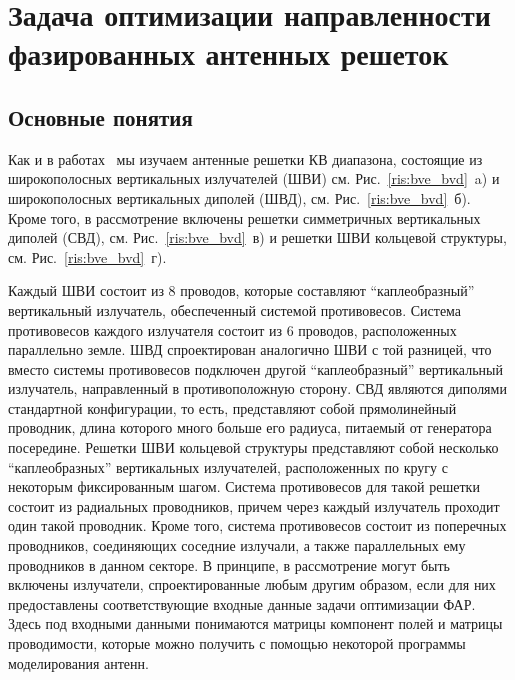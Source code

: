\chapter{Задача оптимизации направленности фазированных антенных решеток}\label{ch:ch1}

\section{Основные понятия}

Как и в работах~\cite{yurkov:groundloss,yurkov:knd} мы изучаем антенные решетки КВ диапазона, состоящие из широкополосных вертикальных
излучателей (ШВИ) см. Рис.~\ref{ris:bve_bvd}~a) и широкополосных вертикальных диполей (ШВД), см. Рис.~\ref{ris:bve_bvd}~б). Кроме того, в
рассмотрение включены решетки симметричных вертикальных диполей (СВД), см. Рис.~\ref{ris:bve_bvd}~в) и решетки ШВИ кольцевой структуры, см. Рис.~\ref{ris:bve_bvd}~г).

Каждый ШВИ состоит из 8 проводов, которые составляют ``каплеобразный'' вертикальный излучатель, обеспеченный системой противовесов.
Система противовесов каждого излучателя состоит из 6 проводов, расположенных параллельно земле. ШВД спроектирован аналогично ШВИ с той
разницей, что вместо системы противовесов подключен другой ``каплеобразный'' вертикальный излучатель, направленный в противоположную сторону. СВД являются диполями стандартной конфигурации, то есть, представляют собой прямолинейный проводник, длина которого много
больше его радиуса, питаемый от генератора посередине. Решетки ШВИ кольцевой структуры представляют собой несколько ``каплеобразных''
вертикальных излучателей, расположенных по кругу с некоторым фиксированным шагом. Система противовесов для такой решетки состоит из
радиальных проводников, причем через каждый излучатель проходит один такой проводник. Кроме того, система противовесов состоит из поперечных проводников, соединяющих соседние излучали, а также параллельных ему проводников в данном секторе. В принципе, в рассмотрение могут быть включены излучатели, спроектированные любым другим образом, если для них предоставлены соответствующие входные данные задачи оптимизации ФАР. Здесь под входными данными понимаются матрицы компонент полей и матрицы проводимости, которые можно получить с помощью некоторой программы моделирования антенн.

